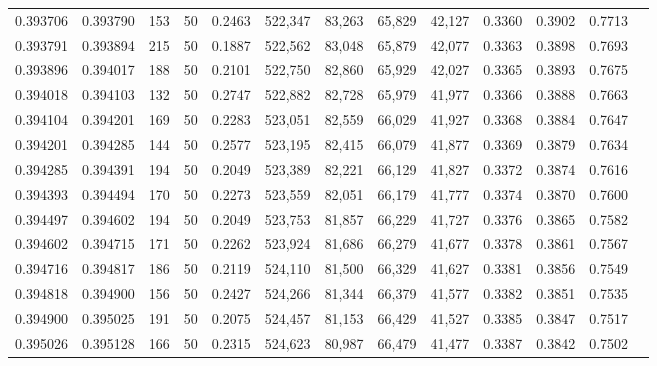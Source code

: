 \begin{tabular}{rrrrrrrrrrrrr}
0.393706 & 0.393790 &   153 &  50 &                                     0.2463 & 522,347 &  83,263 &  65,829 &  42,127 & 0.3360 & 0.3902 & 0.7713 \\
0.393791 & 0.393894 &   215 &  50 &                                     0.1887 & 522,562 &  83,048 &  65,879 &  42,077 & 0.3363 & 0.3898 & 0.7693 \\
0.393896 & 0.394017 &   188 &  50 &                                     0.2101 & 522,750 &  82,860 &  65,929 &  42,027 & 0.3365 & 0.3893 & 0.7675 \\
0.394018 & 0.394103 &   132 &  50 &                                     0.2747 & 522,882 &  82,728 &  65,979 &  41,977 & 0.3366 & 0.3888 & 0.7663 \\
0.394104 & 0.394201 &   169 &  50 &                                     0.2283 & 523,051 &  82,559 &  66,029 &  41,927 & 0.3368 & 0.3884 & 0.7647 \\
0.394201 & 0.394285 &   144 &  50 &                                     0.2577 & 523,195 &  82,415 &  66,079 &  41,877 & 0.3369 & 0.3879 & 0.7634 \\
0.394285 & 0.394391 &   194 &  50 &                                     0.2049 & 523,389 &  82,221 &  66,129 &  41,827 & 0.3372 & 0.3874 & 0.7616 \\
0.394393 & 0.394494 &   170 &  50 &                                     0.2273 & 523,559 &  82,051 &  66,179 &  41,777 & 0.3374 & 0.3870 & 0.7600 \\
0.394497 & 0.394602 &   194 &  50 &                                     0.2049 & 523,753 &  81,857 &  66,229 &  41,727 & 0.3376 & 0.3865 & 0.7582 \\
0.394602 & 0.394715 &   171 &  50 &                                     0.2262 & 523,924 &  81,686 &  66,279 &  41,677 & 0.3378 & 0.3861 & 0.7567 \\
0.394716 & 0.394817 &   186 &  50 &                                     0.2119 & 524,110 &  81,500 &  66,329 &  41,627 & 0.3381 & 0.3856 & 0.7549 \\
0.394818 & 0.394900 &   156 &  50 &                                     0.2427 & 524,266 &  81,344 &  66,379 &  41,577 & 0.3382 & 0.3851 & 0.7535 \\
0.394900 & 0.395025 &   191 &  50 &                                     0.2075 & 524,457 &  81,153 &  66,429 &  41,527 & 0.3385 & 0.3847 & 0.7517 \\
0.395026 & 0.395128 &   166 &  50 &                                     0.2315 & 524,623 &  80,987 &  66,479 &  41,477 & 0.3387 & 0.3842 & 0.7502 \\

\end{tabular}
